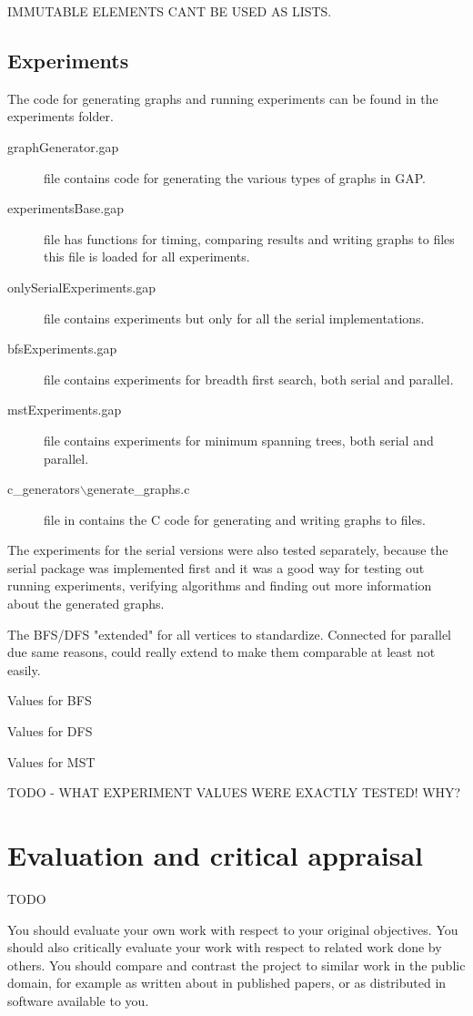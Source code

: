 \documentclass{report}
\theoremstyle{plain}
\theoremstyle{definition}
\theoremstyle{remark}
\begin{document}
IMMUTABLE ELEMENTS CANT BE USED AS LISTS.

\section{Experiments}

The code for generating graphs and running experiments can be found in the experiments folder.
\begin{description}
\item[graphGenerator.gap] file contains code for generating the various types of graphs in GAP.
\item[experimentsBase.gap] file has functions for timing, comparing results and writing graphs to files this file is loaded for all experiments.
\item[onlySerialExperiments.gap] file contains experiments but only for all the serial implementations.
\item[bfsExperiments.gap] file contains experiments for breadth first search, both serial and parallel.
\item[mstExperiments.gap] file contains experiments for minimum spanning trees, both serial and parallel.
\item[c\_generators$\backslash$generate\_graphs.c] file in contains the C code for generating and writing graphs to files.
\end{description}

The experiments for the serial versions were also tested separately, because the serial package was implemented first and it was a good way for testing out running experiments, verifying algorithms and finding out more information about the generated graphs.

The BFS/DFS "extended" for all vertices to standardize. Connected for parallel due same reasons, could really extend to make them comparable at least not easily.

Values for BFS

Values for DFS

Values for MST

TODO - WHAT EXPERIMENT VALUES WERE EXACTLY TESTED! WHY?

\chapter{Evaluation and critical appraisal}

TODO

You should evaluate your own work with respect to your original
objectives. You should also critically evaluate your work with respect to
related work done by others. You should compare and contrast the project
to similar work in the public domain, for example as written about in
published papers, or as distributed in software available to you.
\end{document}
